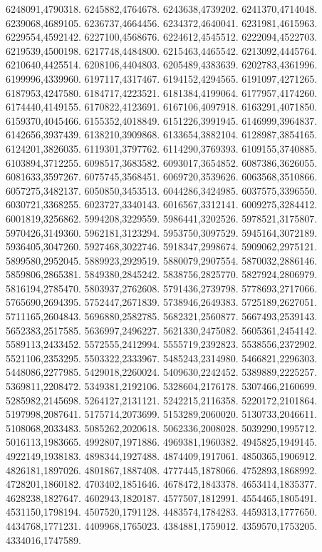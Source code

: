 6248091,4790318.
6245882,4764678.
6243638,4739202.
6241370,4714048.
6239068,4689105.
6236737,4664456.
6234372,4640041.
6231981,4615963.
6229554,4592142.
6227100,4568676.
6224612,4545512.
6222094,4522703.
6219539,4500198.
6217748,4484800.
6215463,4465542.
6213092,4445764.
6210640,4425514.
6208106,4404803.
6205489,4383639.
6202783,4361996.
6199996,4339960.
6197117,4317467.
6194152,4294565.
6191097,4271265.
6187953,4247580.
6184717,4223521.
6181384,4199064.
6177957,4174260.
6174440,4149155.
6170822,4123691.
6167106,4097918.
6163291,4071850.
6159370,4045466.
6155352,4018849.
6151226,3991945.
6146999,3964837.
6142656,3937439.
6138210,3909868.
6133654,3882104.
6128987,3854165.
6124201,3826035.
6119301,3797762.
6114290,3769393.
6109155,3740885.
6103894,3712255.
6098517,3683582.
6093017,3654852.
6087386,3626055.
6081633,3597267.
6075745,3568451.
6069720,3539626.
6063568,3510866.
6057275,3482137.
6050850,3453513.
6044286,3424985.
6037575,3396550.
6030721,3368255.
6023727,3340143.
6016567,3312141.
6009275,3284412.
6001819,3256862.
5994208,3229559.
5986441,3202526.
5978521,3175807.
5970426,3149360.
5962181,3123294.
5953750,3097529.
5945164,3072189.
5936405,3047260.
5927468,3022746.
5918347,2998674.
5909062,2975121.
5899580,2952045.
5889923,2929519.
5880079,2907554.
5870032,2886146.
5859806,2865381.
5849380,2845242.
5838756,2825770.
5827924,2806979.
5816194,2785470.
5803937,2762608.
5791436,2739798.
5778693,2717066.
5765690,2694395.
5752447,2671839.
5738946,2649383.
5725189,2627051.
5711165,2604843.
5696880,2582785.
5682321,2560877.
5667493,2539143.
5652383,2517585.
5636997,2496227.
5621330,2475082.
5605361,2454142.
5589113,2433452.
5572555,2412994.
5555719,2392823.
5538556,2372902.
5521106,2353295.
5503322,2333967.
5485243,2314980.
5466821,2296303.
5448086,2277985.
5429018,2260024.
5409630,2242452.
5389889,2225257.
5369811,2208472.
5349381,2192106.
5328604,2176178.
5307466,2160699.
5285982,2145698.
5264127,2131121.
5242215,2116358.
5220172,2101864.
5197998,2087641.
5175714,2073699.
5153289,2060020.
5130733,2046611.
5108068,2033483.
5085262,2020618.
5062336,2008028.
5039290,1995712.
5016113,1983665.
4992807,1971886.
4969381,1960382.
4945825,1949145.
4922149,1938183.
4898344,1927488.
4874409,1917061.
4850365,1906912.
4826181,1897026.
4801867,1887408.
4777445,1878066.
4752893,1868992.
4728201,1860182.
4703402,1851646.
4678472,1843378.
4653414,1835377.
4628238,1827647.
4602943,1820187.
4577507,1812991.
4554465,1805491.
4531150,1798194.
4507520,1791128.
4483574,1784283.
4459313,1777650.
4434768,1771231.
4409968,1765023.
4384881,1759012.
4359570,1753205.
4334016,1747589.
